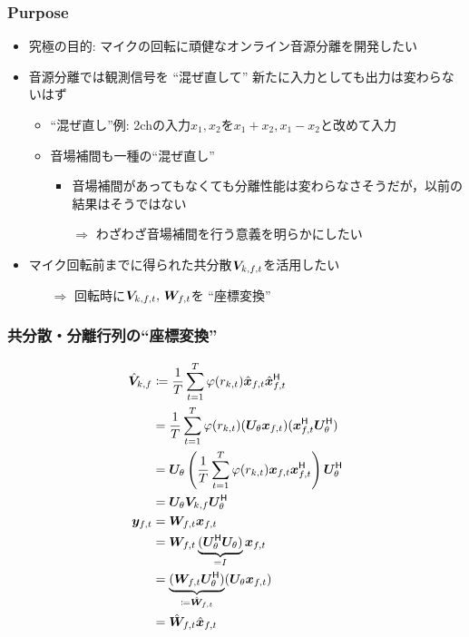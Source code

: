 \documentclass[sip,biber]{now-journal}
\begin{document}
\subsubsection{Purpose}
\begin{itemize}
  \item 究極の目的: マイクの回転に頑健なオンライン音源分離を開発したい
  \item 音源分離では観測信号を ``混ぜ直して'' 新たに入力としても出力は変わらないはず
    \begin{itemize}
      \item ``混ぜ直し''例: 2chの入力$x_1, x_2$を$x_1+x_2, x_1-x_2$と改めて入力
      \item 音場補間も一種の``混ぜ直し''
        \begin{itemize}
          \item 音場補間があってもなくても分離性能は変わらなさそうだが，以前の結果はそうではない
          \item[$\Rightarrow$] わざわざ音場補間を行う意義を明らかにしたい
        \end{itemize}
    \end{itemize}
  \item マイク回転前までに得られた共分散$\cov _{\src,\ft}$を活用したい
    \begin{itemize}
      \item[$\Rightarrow$] 回転時に$\cov _{\src,\ft},\, \Demix _{\ft}$を ``座標変換''
    \end{itemize}
\end{itemize}

\subsubsection{共分散・分離行列の``座標変換''}
\begin{align}
  \rot{\cov} _{\src,\freq} &\coloneqq \frac{1}{\Tframe} \sum _{\tframe = 1} ^{\Tframe} \weight (\var _{\src,\tframe}) \rotObs _{\ft} \rotObs _{\ft} ^{\hermite} \\
                           &= \frac{1}{\Tframe} \sum _{\tframe = 1} ^{\Tframe} \weight (\var _{\src,\tframe}) (\rotMat _{\rotDeg} \Obs _{\ft}) (\Obs _{\ft} ^{\hermite} \rotMat _{\rotDeg} ^{\hermite}) \\
                           &= \rotMat _{\rotDeg} \left(\frac{1}{\Tframe} \sum _{\tframe = 1} ^{\Tframe} \weight (\var _{\src,\tframe}) \Obs _{\ft} \Obs _{\ft} ^{\hermite}\right) \rotMat _{\rotDeg} ^{\hermite} \\
                           &= \rotMat _{\rotDeg} \cov _{\src,\freq} \rotMat _{\rotDeg} ^{\hermite}
  \\
  \Est _{\ft} &= \Demix _{\ft} \Obs _{\ft} \\
              &= \Demix _{\ft} \underbrace{(\rotMat _{\rotDeg} ^{\hermite} \rotMat _{\rotDeg})}_{=I} \Obs _{\ft} \\
              &= \underbrace{(\Demix _{\ft} \rotMat _{\rotDeg} ^{\hermite})}_{\coloneqq \rotDemix _{\ft}} (\rotMat _{\rotDeg} \Obs _{\ft}) \\
              &= \rotDemix _{\ft} \rotObs _{\ft}
\end{align}
\end{document}
